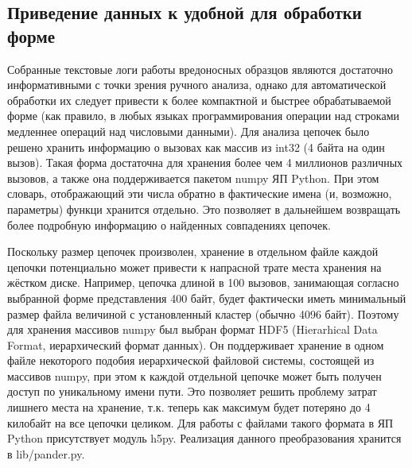 \subsection {Приведение данных к удобной для обработки форме}
Собранные текстовые логи работы вредоносных образцов являются достаточно информативными с точки зрения ручного анализа, однако для автоматической обработки их следует привести к более компактной и быстрее обрабатываемой форме (как правило, в любых языках программирования операции над строками медленнее операций над числовыми данными). Для анализа цепочек было решено хранить информацию о вызовах как массив из int32 (4 байта на один вызов). Такая форма достаточна для хранения более чем 4 миллионов различных вызовов, а также она поддерживается пакетом numpy ЯП Python. При этом словарь, отображающий эти числа обратно в фактические имена (и, возможно, параметры) функци хранится отдельно. Это позволяет в дальнейшем возвращать более подробную информацию о найденных совпадениях цепочек.

Поскольку размер цепочек произволен, хранение в отдельном файле каждой цепочки потенциально может привести к напрасной трате места хранения на жёстком диске. Например, цепочка длиной в 100 вызовов, занимающая согласно выбранной форме представления 400 байт, будет фактически иметь минимальный размер файла величиной с установленный кластер (обычно 4096 байт). Поэтому для хранения массивов numpy был выбран формат HDF5 (Hierarhical Data Format, иерархический формат данных). Он поддерживает хранение в одном файле некоторого подобия иерархической файловой системы, состоящей из массивов numpy, при этом к каждой отдельной цепочке может быть получен доступ по уникальному имени пути. Это позволяет решить проблему затрат лишнего места на хранение, т.к. теперь как максимум будет потеряно до 4  килобайт на все цепочки целиком. Для работы с файлами такого формата в ЯП Python присутствует модуль h5py.
 Реализация данного преобразования хранится в lib/pander.py.

